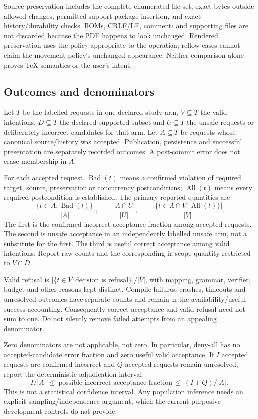 Source preservation includes the complete enumerated file set, exact bytes
outside allowed changes, permitted support-package insertion, and exact
history/durability checks. BOMs, CRLF/LF, comments and supporting files are not
discarded because the PDF happens to look unchanged. Rendered preservation
uses the policy appropriate to the operation; reflow cases cannot claim the
movement policy's unchanged appearance. Neither comparison alone proves TeX
semantics or the user's intent.

\subsection{Outcomes and denominators}
Let $T$ be the labelled requests in one declared study arm, $V\subseteq T$
the valid intentions, $D\subseteq T$ the declared supported subset and
$U\subseteq T$ the unsafe requests or deliberately incorrect candidates for
that arm. Let $A\subseteq T$ be requests whose canonical source/history was
accepted. Publication, persistence and successful presentation are separately
recorded outcomes. A post-commit error does not erase membership in $A$.

For each accepted request, $\operatorname{Bad}(t)$ means a confirmed violation
of required target, source, preservation or concurrency postconditions;
$\operatorname{All}(t)$ means every required postcondition is established.
The primary reported quantities are
\[
\frac{|\{t\in A:\operatorname{Bad}(t)\}|}{|A|},\qquad
\frac{|A\cap U|}{|U|},\qquad
\frac{|\{t\in A\cap V:\operatorname{All}(t)\}|}{|V|}.
\]
The first is the confirmed incorrect-acceptance fraction among accepted
requests. The second is unsafe acceptance in an independently labelled unsafe
arm, not a substitute for the first. The third is useful correct acceptance
among valid intentions. Report raw counts and the corresponding in-scope
quantity restricted to $V\cap D$.

Valid refusal is $|\{t\in V:\text{decision is refusal}\}|/|V|$, with mapping,
grammar, verifier, budget and other reasons kept distinct. Compile failures,
crashes, timeouts and unresolved outcomes have separate counts and remain in
the availability/useful-success accounting. Consequently correct acceptance
and valid refusal need not sum to one. Do not silently remove failed attempts
from an appealing denominator.

Zero denominators are not applicable, not zero. In particular, deny-all has
no accepted-candidate error fraction and zero useful valid acceptance. If
$I$ accepted requests are confirmed incorrect and $Q$ accepted requests remain
unresolved, report the deterministic adjudication interval
\[
 I/|A|\ \leq\ \text{possible incorrect-acceptance fraction}\ \leq\ (I+Q)/|A|.
\]
This is not a statistical confidence interval. Any population inference needs
an explicit sampling/independence argument, which the current purposive
development controls do not provide.

